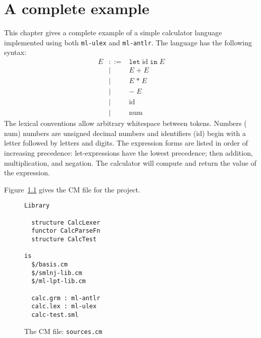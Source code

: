 %
\chapter{A complete example}
\label{ch:example}

This chapter gives a complete example of a simple calculator
language implemented using both \texttt{ml-ulex} and \texttt{ml-antlr}.
The language has the following syntax:
\begin{displaymath}
  \begin{array}{rcl}
    E & ::=  & \mathtt{let}\;\mathrm{id}\;\mathtt{in}\;E \\
      & \mid & E \;\mathtt{+}\; E \\
      & \mid & E \;\mathtt{*}\; E \\
      & \mid & \mathtt{-}\;E \\
      & \mid & \mathrm{id} \\
      & \mid & \mathrm{num}
  \end{array}%
\end{displaymath}%
The lexical conventions allow arbitrary whitespace between tokens.
Numbers ($\mathrm{num}$) numbers are unsigned decimal numbers
and identifiers ($\mathrm{id}$) begin with a letter followed by letters and digits.
The expression forms are listed in order of increasing precedence:
let-expressions have the lowest precedence; then addition, multiplication, and negation.
The calculator will compute and return the value of the expression.

Figure~\ref{fig:calc-sources} gives the CM file for the project.
\begin{figure}[h]
\begin{lstlisting}[language=CM]
Library

  structure CalcLexer
  functor CalcParseFn
  structure CalcTest

is
  $/basis.cm
  $/smlnj-lib.cm
  $/ml-lpt-lib.cm

  calc.grm : ml-antlr
  calc.lex : ml-ulex
  calc-test.sml
\end{lstlisting}%
\caption{The CM file: {\tt sources.cm}}
\label{fig:calc-sources}
\end{figure}%

